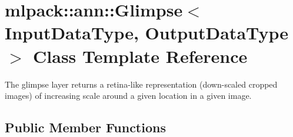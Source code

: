 \section{mlpack\+:\+:ann\+:\+:Glimpse$<$ Input\+Data\+Type, Output\+Data\+Type $>$ Class Template Reference}
\label{classmlpack_1_1ann_1_1Glimpse}


The glimpse layer returns a retina-\/like representation (down-\/scaled cropped images) of increasing scale around a given location in a given image.  


\subsection*{Public Member Functions}
